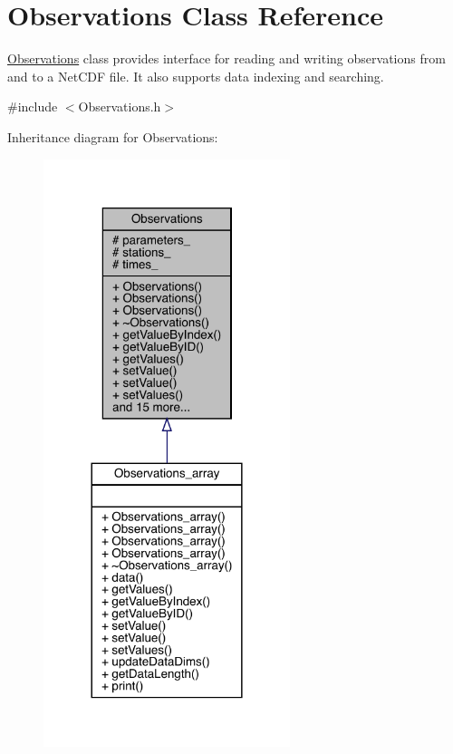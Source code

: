 \hypertarget{class_observations}{}\section{Observations Class Reference}
\label{class_observations}


\mbox{\hyperlink{class_observations}{Observations}} class provides interface for reading and writing observations from and to a Net\+C\+DF file. It also supports data indexing and searching.  




{\ttfamily \#include $<$Observations.\+h$>$}



Inheritance diagram for Observations\+:
\nopagebreak
\begin{figure}[H]
\begin{center}
\leavevmode
\includegraphics[width=204pt]{class_observations__inherit__graph}
\end{center}
\end{figure}


